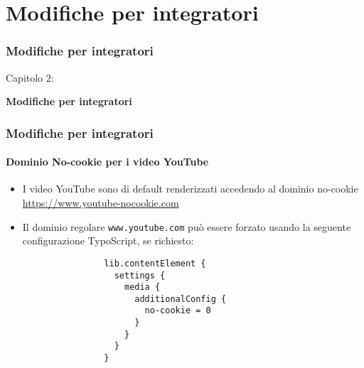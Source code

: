%

\section{Modifiche per integratori}
\begin{frame}[fragile]
	\frametitle{Modifiche per integratori}

	\begin{center}\huge{Capitolo 2:}\end{center}
	\begin{center}\huge{\color{typo3darkgrey}\textbf{Modifiche per integratori}}\end{center}

\end{frame}


\begin{frame}[fragile]
	\frametitle{Modifiche per integratori}
	\framesubtitle{Dominio No-cookie per i video YouTube}

	\lstset{basicstyle=\smaller\ttfamily}

	\begin{itemize}
		\item I video YouTube sono di default renderizzati accedendo al dominio no-cookie
			\url{https://www.youtube-nocookie.com}
		\item Il dominio regolare \texttt{www.youtube.com} può essere forzato usando
			la seguente configurazione TypoScript, se richiesto:

			\begin{lstlisting}
				lib.contentElement {
				  settings {
				    media {
				      additionalConfig {
				        no-cookie = 0
				      }
				    }
				  }
				}
			\end{lstlisting}

	\end{itemize}

\end{frame}

